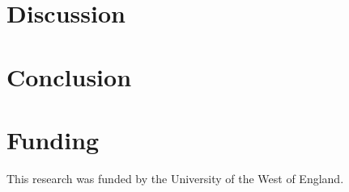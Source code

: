 \documentclass[a4paper]{article}
\begin{document}
\begin{multicols}{2}
\noindent
\begin{minipage}{\columnwidth}
\centering

\label{fig:hopperreward}
\end{minipage}

\noindent
\begin{minipage}{\columnwidth}
\centering

\label{fig:frogreward}
\end{minipage}

\noindent
\begin{minipage}{\columnwidth}
\centering

\label{fig:snakereward}
\end{minipage}

\noindent
\begin{minipage}{\columnwidth}
\centering

\label{fig:scenhopperreward}
\end{minipage}

\noindent
\begin{minipage}{\columnwidth}
\centering

\label{fig:scenfrogreward}
\end{minipage}

\section{Discussion}

\section{Conclusion}

\section*{Funding}
This research was funded by the University of the West of England.

\begin{thebibliography}

\end{thebibliography}

\end{multicols}
\end{document}

